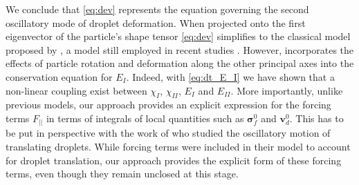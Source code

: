We conclude that \ref{eq:dev} represents the equation governing the second oscillatory mode of droplet deformation. 
When projected onto the first eigenvector of the particle's shape tensor \ref{eq:dev} simplifies to the classical model proposed by \citet{lamb1924hydrodynamics}, a model still employed in recent studies \citep{riviere2021sub}. 
However, incorporates the effects of particle rotation and deformation along the other principal axes into the conservation equation for $E_I$. 
Indeed, with \ref{eq:dt_E_I} we have shown that a non-linear coupling exist between $\chi_I$, $\chi_{II}$, $E_I$ and $E_{II}$. 
More importantly, unlike previous models, our approach provides an explicit expression for the forcing terms $F_{||}$ in terms of integrals of local quantities such as $\bm\sigma_f^0$ and $\textbf{v}_d^0$.
This has to be put in perspective with the work of \citet{lalanne2013effect} who studied the oscillatory motion of translating droplets. 
While forcing terms were included in their model to account for droplet translation, our approach provides the explicit form of these forcing terms, even though they remain unclosed at this stage.


